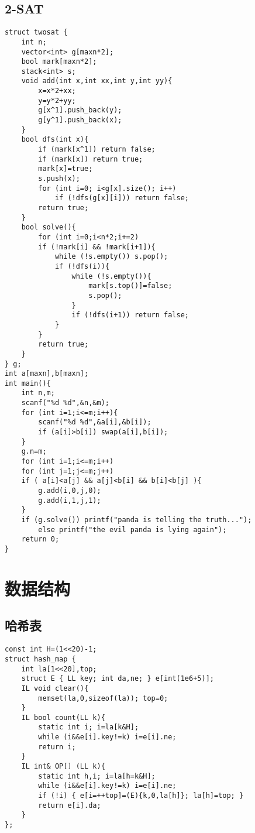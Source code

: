 \documentclass{article}
\begin{document}
\subsection{2-SAT}
\begin{lstlisting}
struct twosat {
	int n;
	vector<int> g[maxn*2];
	bool mark[maxn*2];
	stack<int> s;
	void add(int x,int xx,int y,int yy){
		x=x*2+xx;
		y=y*2+yy;
		g[x^1].push_back(y);
		g[y^1].push_back(x);
	}
	bool dfs(int x){
		if (mark[x^1]) return false;
		if (mark[x]) return true;
		mark[x]=true;
		s.push(x);
		for (int i=0; i<g[x].size(); i++)
			if (!dfs(g[x][i])) return false;
		return true;
	}
	bool solve(){
		for (int i=0;i<n*2;i+=2)
		if (!mark[i] && !mark[i+1]){
			while (!s.empty()) s.pop();
			if (!dfs(i)){
				while (!s.empty()){
					mark[s.top()]=false;
					s.pop();
				}
				if (!dfs(i+1)) return false;
			}
		}
		return true;
	}
} g;
int a[maxn],b[maxn];
int main(){
	int n,m;
	scanf("%d %d",&n,&m);
	for (int i=1;i<=m;i++){
		scanf("%d %d",&a[i],&b[i]);
		if (a[i]>b[i]) swap(a[i],b[i]);
	}	
	g.n=m;	
	for (int i=1;i<=m;i++)
	for (int j=1;j<=m;j++)
	if ( a[i]<a[j] && a[j]<b[i] && b[i]<b[j] ){	
		g.add(i,0,j,0);
		g.add(i,1,j,1);
	}
	if (g.solve()) printf("panda is telling the truth...");
		else printf("the evil panda is lying again");
	return 0;
}
\end{lstlisting}

\section{数据结构}

\subsection{哈希表}
\begin{lstlisting}
const int H=(1<<20)-1;
struct hash_map {
	int la[1<<20],top;
	struct E { LL key; int da,ne; } e[int(1e6+5)];
	IL void clear(){
		memset(la,0,sizeof(la)); top=0;
	}
	IL bool count(LL k){
		static int i; i=la[k&H];
		while (i&&e[i].key!=k) i=e[i].ne;
		return i;
	}
	IL int& OP[] (LL k){
		static int h,i; i=la[h=k&H];
		while (i&&e[i].key!=k) i=e[i].ne;
		if (!i) { e[i=++top]=(E){k,0,la[h]}; la[h]=top; }
		return e[i].da;
	}
};
\end{lstlisting}
\end{document}
